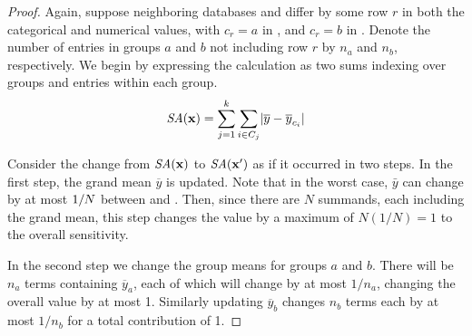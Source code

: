 \begin{proof}
Again, suppose neighboring databases \x and \xprime differ by some row $r$ in both the categorical and numerical values, with $c_r = a$ in \x, and $c_r = b$ in \xprime. Denote the number of entries in groups $a$ and $b$ not including row $r$ by $n_a$ and $n_b$, respectively. We begin by expressing the \sa calculation as two sums indexing over groups and entries within each group.
$$
\textit{SA}(\mathbf{x})  = \sum_{j = 1}^{k}\sum_{i \in C_j} \lvert \overline{y} - \overline{y}_{c_i} \rvert
$$

Consider the change from $\textit{SA}(\mathbf{x})$ to $\textit{SA}(\mathbf{x'})$ as if it occurred in two steps.  In the first step, the grand mean $\overline{y}$ is updated.  Note that in the worst case, $\bar{y}$ can change by at most $1/N$ between \x and \xprime. Then, since there are $N$ summands, each including the grand mean, this step changes the value by a maximum of $N(1/N)=1$ to the overall sensitivity. 

In the second step we change the group means for groups $a$ and $b$.  There will be $n_a$ terms containing $\overline{y}_a$, each of which will change by at most $1/n_a$, changing the overall value by at most 1.  Similarly updating $\overline{y}_b$ changes $n_b$ terms each by at most $1/n_b$ for a total contribution of 1.  



\end{proof}

